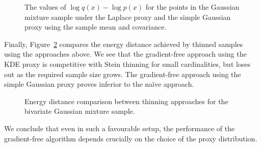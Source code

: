 \documentclass[11pt,a4paper]{report}
\begin{document}
\begin{figure}[h]
\centering
{}
\caption{The values of $\log q(x) - \log p(x)$ for the points in the Gaussian mixture sample under the Laplace proxy and the simple Gaussian proxy using the sample mean and covariance.
\label{fig:gmm:laplace-failure}}
\end{figure}

Finally, Figure~\ref{fig:gmm:comparison} compares the energy distance achieved by thinned samples using the approaches above. We see that the gradient-free approach using the KDE proxy is competitive with Stein thinning for small cardinalities, but loses out as the required sample size grows. The gradient-free approach using the simple Gaussian proxy proves inferior to the na\"ive approach.

\begin{figure}[h]
\centering
{}
\caption{Energy distance comparison between thinning approaches for the bivariate Gaussian mixture sample.
\label{fig:gmm:comparison}}
\end{figure}

We conclude that even in such a favourable setup, the performance of the gradient-free algorithm depends crucially on the choice of the proxy distribution.
\end{document}
